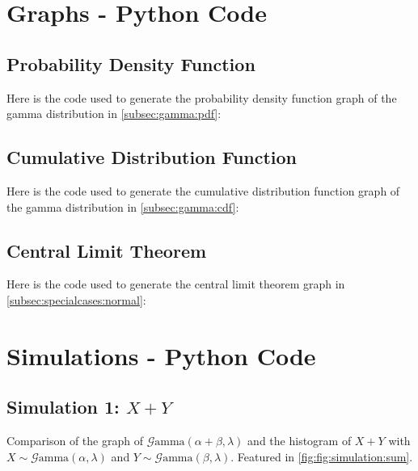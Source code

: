 \documentclass[12pt]{article}
\newcommand{\G}{\mathcal{G}}
\begin{document}
\pagebreak

\begin{appendix}
\section{Graphs - Python Code}
\subsection{Probability Density Function}
Here is the code used to generate the probability density function graph of the gamma distribution in
\autoref{subsec:gamma:pdf}:


\pagebreak
\subsection{Cumulative Distribution Function}
Here is the code used to generate the cumulative distribution function graph of the gamma distribution in
\autoref{subsec:gamma:cdf}:


\pagebreak
\subsection{Central Limit Theorem}
Here is the code used to generate the central limit theorem graph in \autoref{subsec:specialcases:normal}:


\pagebreak
\section{Simulations - Python Code}
\subsection{Simulation 1: $X+Y$}
Comparison of the graph of $\G\text{amma}(\alpha+\beta, \lambda)$ and the histogram of $X+Y$ with
$X\sim\G\text{amma}(\alpha, \lambda)$ and $Y\sim\G\text{amma}(\beta, \lambda)$. Featured in
\autoref{fig:fig:simulation:sum}.



\end{appendix}
\end{document}
